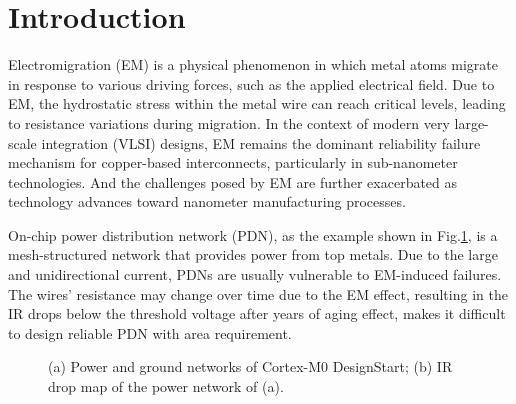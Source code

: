 \section{Introduction}
\label{sec:intro}
Electromigration (EM) is a physical phenomenon in which metal atoms migrate in response to various driving forces, such as the applied electrical field. 
Due to EM, the hydrostatic stress within the metal wire can reach critical levels, leading to resistance variations during migration. 
In the context of modern very large-scale integration (VLSI) designs, EM remains the dominant reliability failure mechanism for copper-based interconnects, particularly in sub-nanometer technologies. And the challenges posed by EM are further exacerbated as technology advances toward nanometer manufacturing processes. 


On-chip power distribution network (PDN), as the example shown in Fig.\ref{fig:pgimage}, is a mesh-structured network that provides power from top metals. 
Due to the large and unidirectional current, PDNs are usually vulnerable to EM-induced failures. The wires' resistance may change over time due to the EM effect, resulting in the IR drops below the threshold voltage after years of aging effect, makes it difficult to design reliable PDN with area requirement.

\begin{figure}[htp]
	\centering
	\caption{(a) Power and ground networks of Cortex-M0 DesignStart; (b) IR drop map of the power network of (a).}
	\label{fig:pgimage}
\end{figure}


